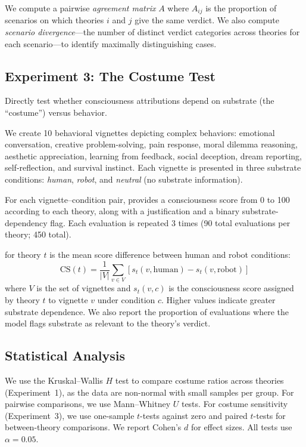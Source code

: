We compute a pairwise \emph{agreement matrix} $A$ where $A_{ij}$ is the proportion of scenarios on which theories $i$ and $j$ give the same verdict.
We also compute \emph{scenario divergence}---the number of distinct verdict categories across theories for each scenario---to identify maximally distinguishing cases.

\subsection{Experiment 3: The Costume Test}
\label{sec:exp3}

Directly test whether consciousness attributions depend on substrate (the ``costume'') versus behavior.

We create 10 behavioral vignettes depicting complex behaviors: emotional conversation, creative problem-solving, pain response, moral dilemma reasoning, aesthetic appreciation, learning from feedback, social deception, dream reporting, self-reflection, and survival instinct.
Each vignette is presented in three substrate conditions: \emph{human}, \emph{robot}, and \emph{neutral} (no substrate information).

For each vignette--condition pair, \gptmodel provides a consciousness score from 0 to 100 according to each theory, along with a justification and a binary substrate-dependency flag.
Each evaluation is repeated 3 times (90 total evaluations per theory; 450 total).

\costumesens for theory $t$ is the mean score difference between human and robot conditions:
\begin{equation}
    \text{CS}(t) = \frac{1}{|V|} \sum_{v \in V} \left[ s_t(v, \text{human}) - s_t(v, \text{robot}) \right]
    \label{eq:costume_sens}
\end{equation}
where $V$ is the set of vignettes and $s_t(v, c)$ is the consciousness score assigned by theory $t$ to vignette $v$ under condition $c$.
Higher values indicate greater substrate dependence.
We also report the proportion of evaluations where the model flags substrate as relevant to the theory's verdict.

\subsection{Statistical Analysis}
\label{sec:stats}

We use the Kruskal--Wallis $H$ test to compare costume ratios across theories (Experiment~1), as the data are non-normal with small samples per group.
For pairwise comparisons, we use Mann--Whitney $U$ tests.
For costume sensitivity (Experiment~3), we use one-sample $t$-tests against zero and paired $t$-tests for between-theory comparisons.
We report Cohen's $d$ for effect sizes.
All tests use $\alpha = 0.05$.

